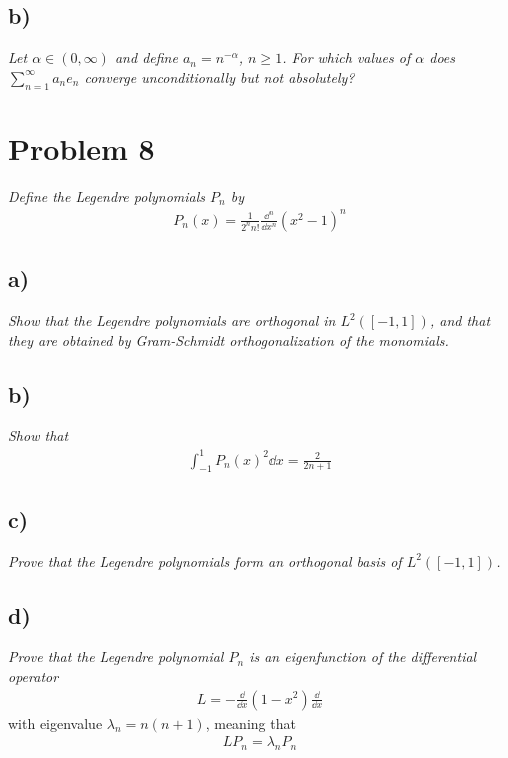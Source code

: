 \documentclass[12pt]{article}
\theoremstyle{plain}
\begin{document}
\subsection*{ b)}
\emph{Let $\alpha \in (0, \infty)$ and define $a_n = n^{-\alpha}$, $n \geq 1$.  For which values of $\alpha$ does $\sum_{n=1}^\infty a_ne_n$ converge unconditionally but not absolutely?}


\section*{Problem 8}
\emph{Define the Legendre polynomials $P_n$ by}
\begin{align*}
    P_n(x) = \frac{1}{2^n n!}\frac{\dd^n}{\dd x^n}(x^2 - 1)^n
\end{align*}

\subsection*{ a)}
\emph{Show that the Legendre polynomials are orthogonal in $L^2([-1,1])$, and that they are obtained by Gram-Schmidt orthogonalization of the monomials.}

\subsection*{ b)}
\emph{Show that}
\begin{align*}
    \int_{-1}^1 P_n(x)^2\dd x = \frac{2}{2n + 1}
\end{align*}

\subsection*{ c)}
\emph{Prove that the Legendre polynomials form an orthogonal basis of $L^2([-1,1])$.}

\subsection*{ d)}
\emph{Prove that the Legendre polynomial $P_n$ is an eigenfunction of the differential operator}
\begin{align*}
    L = -\frac{\dd}{\dd x}(1 - x^2)\frac{\dd}{\dd x}
\end{align*}
with eigenvalue $\lambda_n = n(n+1)$, meaning that
\begin{align*}
    LP_n = \lambda_nP_n
\end{align*}
\end{document}
